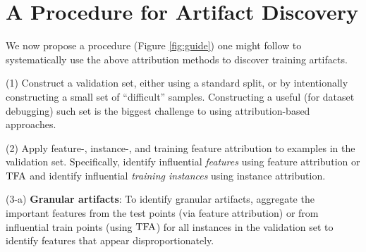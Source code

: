 \documentclass[11pt]{article}
\begin{document}
\section{A Procedure for Artifact Discovery}

We now propose a procedure (Figure \ref{fig:guide}) one might follow to systematically use the above attribution methods to discover training artifacts.

\vspace{0.2em}
 \noindent (1) Construct a validation set, either using a standard split, or by intentionally constructing a small set of ``difficult'' samples. Constructing a useful (for dataset debugging) such set is the biggest challenge to using attribution-based approaches. %

 \vspace{0.2em}
\noindent (2) Apply feature-, instance-, and training feature attribution to examples in the validation set. Specifically, identify influential \emph{features} using feature attribution or $\text{TFA}$ and identify influential \emph{training instances} using instance attribution. 

\vspace{0.2em}    
 \noindent (3-a) \textbf{Granular artifacts}: To identify %
    granular artifacts, aggregate the important features from the test points (via feature attribution) or from influential train points (using $\text{TFA}$) for all instances in the validation set to identify features that appear disproportionately.
\end{document}
